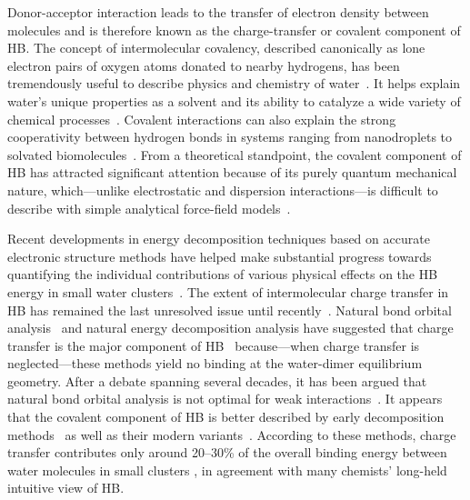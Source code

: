 \documentclass[journal=jacsat,manuscript=article]{achemso}
\begin{document}
Donor-acceptor interaction leads to the transfer of electron density between molecules and is therefore known as the charge-transfer or covalent component of HB. 
The concept of intermolecular covalency, described canonically as lone electron pairs of oxygen atoms donated to nearby hydrogens, has been tremendously useful to describe physics and chemistry of water~\cite{RZK}.
It helps explain water's unique properties as a solvent and its ability to catalyze a wide variety of chemical processes~\cite{RZK}. Covalent interactions can also explain the strong cooperativity between hydrogen bonds in systems ranging from nanodroplets to solvated biomolecules~\cite{RZK}. 
From a theoretical standpoint, the covalent component of HB has attracted significant attention because of its purely quantum mechanical nature, which---unlike electrostatic and dispersion interactions---is difficult to describe with simple analytical force-field models~\cite{lee2011effects, gordon2013accurate}.

Recent developments in energy decomposition techniques based on accurate electronic structure methods have helped make substantial progress towards quantifying the individual contributions of various physical effects on the HB energy in small water clusters~\cite{RZK}. 
The extent of intermolecular charge transfer in HB has remained the last unresolved issue until recently~\cite{isaacs1999covalency,ghanty2000hydrogen,stone2017natural}. 
Natural bond orbital analysis~\cite{weinhold1998natural} and natural energy decomposition analysis \cite{glendening1994natural} have suggested that charge transfer is the major component of HB~\cite{schenter1996natural,glendening2005natural,weinhold2005resonance} because---when charge transfer is neglected---these methods yield no binding at the water-dimer equilibrium geometry. 
After a debate spanning several decades, it has been argued that natural bond orbital analysis is not optimal for weak interactions~\cite{stone2017natural}. 
It appears that the covalent component of HB is better described by early decomposition methods~\cite{kitaura1976new,bagus1984new,bagus1992decomposition,stevens1987frozen,chen1996energy,stone1993computation} as well as their modern variants~\cite{mo2000energy,misquitta2013charge,khaliullin2007unravelling,misquitta2013charge}. 
According to these methods, charge transfer contributes only around 20--30\% of the overall binding energy between water molecules in small clusters \cite{stevens1987frozen,stone1993computation,chen1996energy,piquemal2005csov,khaliullin2009electron,cobar2012examination}, in agreement with many chemists' long-held intuitive view of HB.
\end{document}

